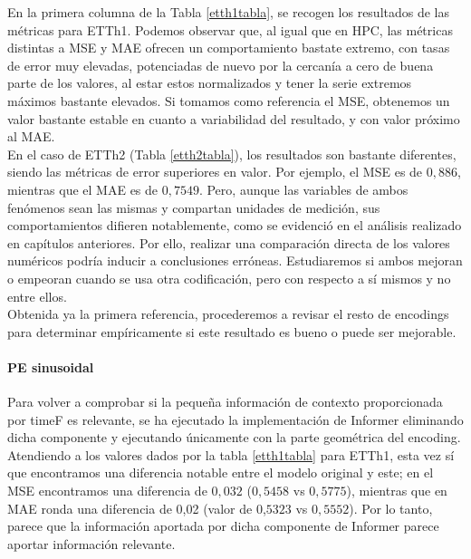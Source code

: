 En la primera columna de la Tabla \ref{etth1tabla}, se recogen los resultados de las métricas para ETTh1. Podemos observar que, al igual que en HPC, las métricas distintas a MSE y MAE ofrecen un comportamiento bastate extremo, con tasas de error muy elevadas, potenciadas de nuevo por la cercanía a cero de buena parte de los valores, al estar estos normalizados y tener la serie extremos máximos bastante elevados. Si tomamos como referencia el MSE, obtenemos un valor bastante estable en cuanto a variabilidad del resultado, y con valor próximo al MAE.\\

En el caso de ETTh2 (Tabla \ref{etth2tabla}), los resultados son bastante diferentes, siendo las métricas de error superiores en valor. Por ejemplo, el MSE es de $0,886$, mientras que el MAE es de $0,7549$. Pero, aunque las variables de ambos fenómenos sean las mismas y compartan unidades de medición, sus comportamientos difieren notablemente, como se evidenció en el análisis realizado en capítulos anteriores. Por ello, realizar una comparación directa de los valores numéricos podría inducir a conclusiones erróneas. Estudiaremos si ambos mejoran o empeoran cuando se usa otra codificación, pero con respecto a sí mismos y no entre ellos.\\

Obtenida ya la primera referencia, procederemos a revisar el resto de encodings para determinar empíricamente si este resultado es bueno o puede ser mejorable.
 
 
\paragraph{PE sinusoidal}
 
 Para volver a comprobar si la pequeña información de contexto proporcionada por timeF es relevante, se ha ejecutado la implementación de Informer eliminando dicha componente y ejecutando únicamente con la parte geométrica del encoding.\\
  
  Atendiendo a los valores dados por la tabla \ref{etth1tabla} para ETTh1, esta vez sí que encontramos una diferencia notable entre el modelo original y este; en el MSE encontramos una diferencia de $0,032$ ($0,5458$ vs $0,5775$), mientras que en MAE ronda una diferencia de 0,02 (valor de 0,$5323$ vs $0,5552$). Por lo tanto, parece que la información aportada por dicha componente de Informer parece aportar información relevante.\\
  
